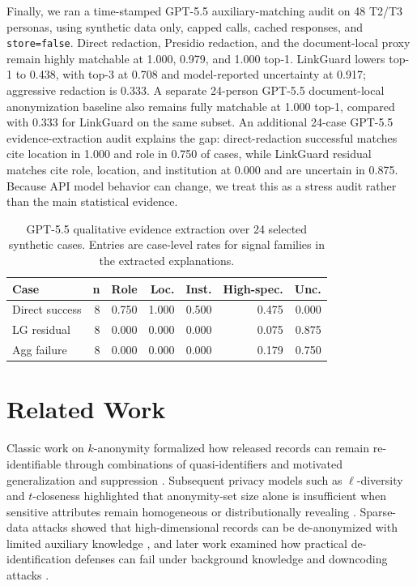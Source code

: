 \documentclass{article}
\newcommand{\method}{LinkGuard}
\begin{document}
Finally, we ran a time-stamped GPT-5.5 auxiliary-matching audit on 48 T2/T3 personas, using synthetic data only, capped calls, cached responses, and \texttt{store=false}.
Direct redaction, Presidio redaction, and the document-local proxy remain highly matchable at 1.000, 0.979, and 1.000 top-1.
\method{} lowers top-1 to 0.438, with top-3 at 0.708 and model-reported uncertainty at 0.917; aggressive redaction is 0.333.
A separate 24-person GPT-5.5 document-local anonymization baseline also remains fully matchable at 1.000 top-1, compared with 0.333 for \method{} on the same subset.
An additional 24-case GPT-5.5 evidence-extraction audit explains the gap: direct-redaction successful matches cite location in 1.000 and role in 0.750 of cases, while \method{} residual matches cite role, location, and institution at 0.000 and are uncertain in 0.875.
Because API model behavior can change, we treat this as a stress audit rather than the main statistical evidence.

\begin{table}[t]
\centering
\small
\setlength{\tabcolsep}{3pt}
\caption{GPT-5.5 qualitative evidence extraction over 24 selected synthetic cases. Entries are case-level rates for signal families in the extracted explanations.}
\label{tab:gpt55_evidence_signals}
\begin{tabular}{lrrrrrr}
\toprule
Case & n & Role & Loc. & Inst. & High-spec. & Unc. \\
\midrule
Direct success & 8 & 0.750 & 1.000 & 0.500 & 0.475 & 0.000 \\
LG residual & 8 & 0.000 & 0.000 & 0.000 & 0.075 & 0.875 \\
Agg failure & 8 & 0.000 & 0.000 & 0.000 & 0.179 & 0.750 \\
\bottomrule
\end{tabular}
\end{table}

\section{Related Work}

Classic work on $k$-anonymity formalized how released records can remain re-identifiable through combinations of quasi-identifiers and motivated generalization and suppression \citep{sweeney2002}.
Subsequent privacy models such as $\ell$-diversity and $t$-closeness highlighted that anonymity-set size alone is insufficient when sensitive attributes remain homogeneous or distributionally revealing \citep{machanavajjhala2007ldiversity,li2007tcloseness}.
Sparse-data attacks showed that high-dimensional records can be de-anonymized with limited auxiliary knowledge \citep{narayanan2008}, and later work examined how practical de-identification defenses can fail under background knowledge and downcoding attacks \citep{cohen2022attacks}.
\end{document}
